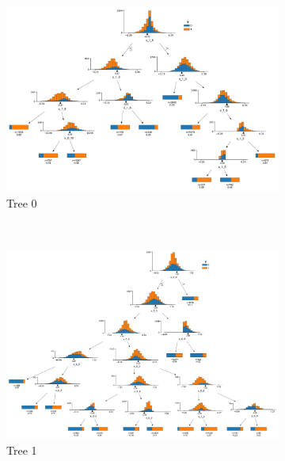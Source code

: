 \newpage

\begin{landscape}
\begin{figure}[H]
  \centering
  \begin{subfigure}[b]{0.32\linewidth}\centering
      \includegraphics[width=\textwidth]{figures/ml/figs_demo/dtreeviz_figs_0}
  \caption{Tree 0}
  \label{fig:FIGS:demo_trees:tree0}
  \end{subfigure}
  ~
  \begin{subfigure}[b]{0.32\linewidth}\centering
      \includegraphics[width=\textwidth]{figures/ml/figs_demo/dtreeviz_figs_1}
  \caption{Tree 1}
  \label{fig:FIGS:demo_trees:tree1}
  \end{subfigure}
  ~
  \begin{subfigure}[b]{0.32\linewidth}\centering

\end{subfigure}
\end{figure}
\end{landscape}
